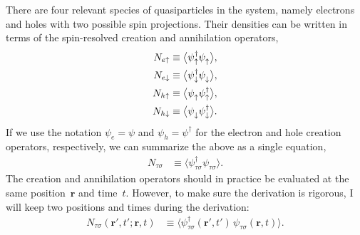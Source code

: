 There are four relevant species of quasiparticles in the system, namely electrons and holes with two possible spin projections.
Their densities can be written in terms of the spin-resolved creation and annihilation operators,
\begin{align}
  N_{e\uparrow} &\equiv \big\langle \psi_{\uparrow}^\dagger \psi_{\uparrow}^{\phantom{\dagger}} \big\rangle, \\
  N_{e\downarrow} &\equiv \big\langle \psi_{\downarrow}^\dagger \psi_{\downarrow}^{\phantom{\dagger}} \big\rangle, \\
  N_{h\uparrow} &\equiv \big\langle \psi_{\uparrow}^{\phantom{\dagger}} \psi_{\uparrow}^\dagger \big\rangle, \\
  N_{h\downarrow} &\equiv \big\langle \psi_{\downarrow}^{\phantom{\dagger}} \psi_{\downarrow}^\dagger \big\rangle.
\end{align}
If we use the notation $\psi_e = \psi$ and $\psi_h = \psi^\dagger$ for the electron and hole creation operators, respectively, we can summarize the above as a single equation,
\begin{align}
  N_{\tau\sigma} &\equiv \big\langle \psi_{\tau\sigma}^\dagger \psi_{\tau\sigma}^{\phantom{\dagger}} \big\rangle.
\end{align}
The creation and annihilation operators should in practice be evaluated at the same position~$\bm{r}$ and time~$t$.
However, to make sure the derivation is rigorous, I will keep two positions and times during the derivation:
\begin{align}
  N_{\tau\sigma}(\bm{r}',t'; \bm{r},t) &\equiv \big\langle \psi_{\tau\sigma}^\dagger(\bm{r}',t')\, \psi_{\tau\sigma}^{\phantom{\dagger}}(\bm{r},t) \big\rangle.
\end{align}

